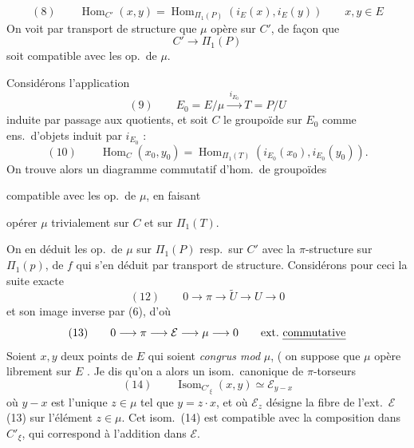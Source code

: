 \documentclass[11pt,a4paper]{article}
\begin{document}
\[
  (8) \qquad \operatorname{Hom}_{C'}(x, y) = \operatorname{Hom}_{\Pi_1(P)}(i_E(x), i_E(y))
  \qquad x, y \in E
\]
On voit par transport de structure que $\mu$ opère sur $C'$, de façon que
\[
  C' \longrightarrow \Pi_1(P)
\]
soit compatible avec les op.\ de $\mu$.

Considérons l'application
\[
  (9) \qquad E_0 = E/\mu \xrightarrow{\;i_{E_0}\;} T = P/U
\]
induite par passage aux quotients, et soit \struck{\ill{}} $C$ le groupoïde sur $E_0$ comme
ens.\ d'objets induit par $i_{E_0}$ :
\[
  (10) \qquad \operatorname{Hom}_C(x_0, y_0) = \operatorname{Hom}_{\Pi_1(T)}(i_{E_0}(x_0), i_{E_0}(y_0)) .
\]
On trouve alors un diagramme commutatif d'hom.\ de groupoïdes


compatible avec les op.\ de $\mu$, en faisant


opérer $\mu$ trivialement sur $C$ et sur $\Pi_1(T)$.

On en déduit les op.\ de $\mu$ sur $\Pi_1(P)$ resp.\ sur $C'$ avec la $\pi$-structure sur
$\Pi_1(p)$,  de $f$ qui s'en déduit par transport de structure. Considérons
pour ceci la suite exacte
\[
  (12) \qquad 0 \longrightarrow \pi \longrightarrow \widetilde{U} \longrightarrow U \longrightarrow 0
\]
et son image inverse par (6), d'où
\[
  (13) \qquad 0 \longrightarrow \pi \longrightarrow \mathcal{E} \longrightarrow \mu \longrightarrow 0
  \qquad \text{ext.\ \uncertain{commutative}}
\]
 
Soient $x, y$ deux points de $E$ \struck{\ill{}} qui   \ill{} soient \emph{congrus mod} $\mu$, ( on suppose que
\struck{\ill{}} $\mu$ opère librement sur $E$ .
Je dis qu'on a alors un isom.\ canonique de $\pi$-torseurs
\[
  (14) \qquad \operatorname{Isom}_{C'_\xi}(x, y) \simeq \mathcal{E}_{y - x}
\]
où $y - x$ est l'unique $z \in \mu$ tel que $y = z \cdot x$, et où $\mathcal{E}_z$ désigne la
fibre de l'ext.\ $\mathcal{E}$ (13) sur l'élément $z \in \mu$. Cet isom.\ (14) est compatible
avec la composition dans $C'_\xi$, qui correspond à l'addition dans $\mathcal{E}$.
\end{document}

